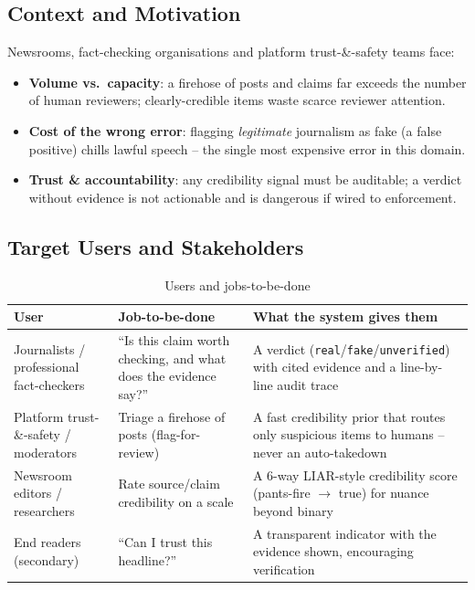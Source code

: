 \documentclass[12pt,a4paper]{article}
\begin{document}
\subsection{Context and Motivation}

Newsrooms, fact-checking organisations and platform trust-\&-safety teams face:
\begin{itemize}
  \item \textbf{Volume vs.\ capacity}: a firehose of posts and claims far exceeds the number of human reviewers; clearly-credible items waste scarce reviewer attention.
  \item \textbf{Cost of the wrong error}: flagging \emph{legitimate} journalism as fake (a false positive) chills lawful speech -- the single most expensive error in this domain.
  \item \textbf{Trust \& accountability}: any credibility signal must be auditable; a verdict without evidence is not actionable and is dangerous if wired to enforcement.
\end{itemize}

\subsection{Target Users and Stakeholders}

\begin{table}[H]
\centering
\caption{Users and jobs-to-be-done}
\small
\begin{tabularx}{\linewidth}{@{} l L L @{}}
\toprule
\textbf{User} & \textbf{Job-to-be-done} & \textbf{What the system gives them} \\
\midrule
Journalists / professional fact-checkers & ``Is this claim worth checking, and what does the evidence say?'' & A verdict (\texttt{real}/\texttt{fake}/\texttt{unverified}) with cited evidence and a line-by-line audit trace \\
Platform trust-\&-safety / moderators & Triage a firehose of posts (flag-for-review) & A fast credibility prior that routes only suspicious items to humans -- never an auto-takedown \\
Newsroom editors / researchers & Rate source/claim credibility on a scale & A 6-way LIAR-style credibility score (pants-fire $\rightarrow$ true) for nuance beyond binary \\
End readers (secondary) & ``Can I trust this headline?'' & A transparent indicator with the evidence shown, encouraging verification \\
\bottomrule
\end{tabularx}
\end{table}
\end{document}

